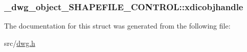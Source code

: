 \hypertarget{struct__dwg__object__SHAPEFILE__CONTROL_a323f4f8d1ecb1f130defd0c2285fff62}{
\subsubsection[{xdicobjhandle}]{ {\bf \-\_\-dwg\-\_\-object\-\_\-\-S\-H\-A\-P\-E\-F\-I\-L\-E\-\_\-\-C\-O\-N\-T\-R\-O\-L\-::xdicobjhandle}}}\label{struct__dwg__object__SHAPEFILE__CONTROL_a323f4f8d1ecb1f130defd0c2285fff62}


\-The documentation for this struct was generated from the following file\-:\begin{DoxyCompactItemize}
\item 
src/\hyperlink{dwg_8h}{dwg.\-h}\end{DoxyCompactItemize}
